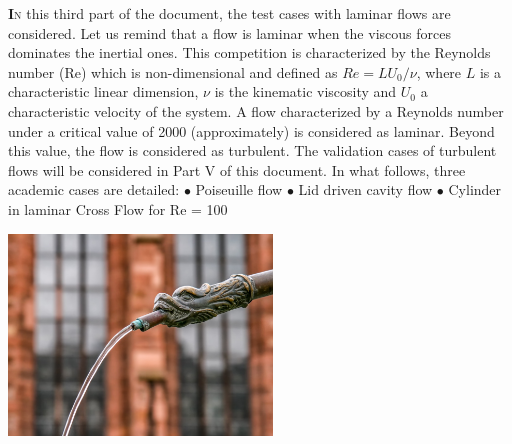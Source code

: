 \vspace*{1.5cm}
\lettrine[lines=2,slope=0pt,nindent=4pt]{\textbf{I}}{n} this third part of the document,
the test cases with laminar flows are considered.
Let us remind that a flow is laminar when the viscous forces dominates the inertial ones. 
This competition is characterized by the Reynolds number (Re) which is non-dimensional and
defined as $Re=L U_{0}/\nu$, where $L$ is a characteristic linear dimension, $\nu$
is the kinematic viscosity and $U_{0}$ a characteristic velocity of the system.
A flow characterized by a Reynolds number under a critical value of 2000 (approximately)
is considered as laminar. Beyond this value, the flow is considered as turbulent.
The validation cases of turbulent flows will be considered in Part V of this document. In what
follows, three academic cases are detailed:\vspace*{0.5cm}\newline
\hspace*{0.5cm} $\bullet$ Poiseuille flow\vspace*{0.5cm}\newline
\hspace*{0.5cm} $\bullet$ Lid driven cavity flow\vspace*{0.5cm}\newline
\hspace*{0.5cm} $\bullet$ Cylinder in laminar Cross Flow for Re = 100\vspace*{3cm}\newline
\begin{center}\includegraphics[width=7cm]{tools/jet_laminaire.jpg}\end{center}
